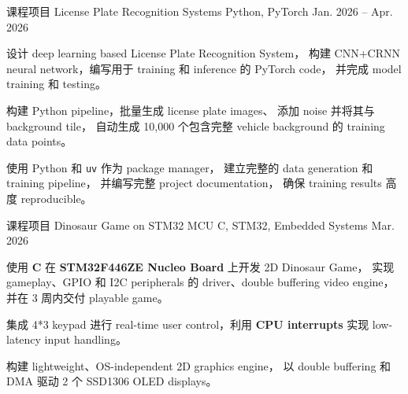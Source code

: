 \begin{cventries}
  \cventry
  {课程项目}
  {License Plate Recognition Systems}
  {Python, PyTorch}
  {Jan. 2026 -- Apr. 2026}
  {
    \begin{cvitems}
      \item
            {
                  设计 deep learning based License Plate Recognition System，
                  构建 CNN+CRNN neural network，编写用于 training 和 inference 的 PyTorch code，
                  并完成 model training 和 testing。
            }
      \item
            {
                  构建 Python pipeline，批量生成 license plate images、
                  添加 noise 并将其与 background tile，
                  自动生成 10,000 个包含完整 vehicle background 的 training data points。
            }
      \item
            {
                  使用 Python 和 \texttt{uv} 作为 package manager，
                  建立完整的 data generation 和 training pipeline，
                  并编写完整 project documentation，
                  确保 training results 高度 reproducible。
            }
    \end{cvitems}
  }

  \cventry
  {课程项目}
  {Dinosaur Game on STM32 MCU}
  {C, STM32, Embedded Systems}
  {Mar. 2026}
  {
    \begin{cvitems}
      \item
            {
                  使用 \textbf{C} 在 \textbf{STM32F446ZE Nucleo Board} 上开发 2D Dinosaur Game，
                  实现 gameplay、GPIO 和 I2C peripherals 的 driver、double buffering video engine，
                  并在 3 周内交付 playable game。
            }
      \item
            {
                  集成 4*3 keypad 进行 real-time user control，利用 \textbf{CPU interrupts} 实现 low-latency input handling。
            }
      \item
            {
                  构建 lightweight、OS-independent 2D graphics engine，
                  以 double buffering 和 DMA 驱动 2 个 SSD1306 OLED displays。
            }
    \end{cvitems}
  }


\end{cventries}

